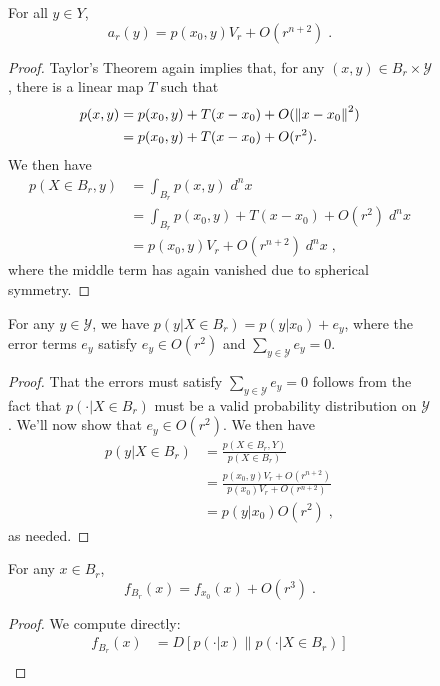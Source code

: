 \documentclass[english]{scrartcl}
\begin{document}
\begin{figure}
	\begin{lm}
		For all $y\in Y$,
		\begin{equation*}
			a_r(y) = p(x_0,y)V_r + O(r^{n+2})\;.
		\end{equation*}
	\end{lm}
	\begin{proof}
		Taylor's Theorem again implies that, for any $(x,y)\in B_r \times \mathcal{Y}$, there is a linear map $T$ such that
		\begin{align*}
			p(x,y) &= p(x_0,y) + T(x - x_0) + O(\left\lVert x - x_0\right\rVert^2) \\
			&= p(x_0,y) + T(x - x_0) + O(r^2). 
		\end{align*}
		We then have 
		\begin{align*}
			p(X \in B_r, y) &= \int_{B_r} p(x,y) \; d^n x \\ 
			&= \int_{B_r} p(x_0,y) + T(x - x_0) + O(r^2) \; d^n x \\
			&= p(x_0,y)V_r + O(r^{n+2}) \; d^n x\;,
		\end{align*}
		where the middle term has again vanished due to spherical symmetry. 
	\end{proof}
	\begin{lm}
		For any $y \in \mathcal{Y}$, we have $p(y|X \in B_r) = p(y|x_0) + e_y$, where the error terms $e_y$ satisfy $e_y \in O(r^2)$ and $\sum_{y \in \mathcal{Y}} e_y = 0$. 
	\end{lm}
	\begin{proof}
		That the errors must satisfy $\sum_{y \in \mathcal{Y}} e_y = 0$ follows from the fact that $p(\cdot| X \in B_r)$ must be a valid probability distribution on $\mathcal{Y}$. We'll now show that $e_y \in O(r^2)$. We then have 
		\begin{align*}
			p(y|X \in B_r) &= \frac{p(X \in B_r, Y)}{p(X\in B_r)} \\
			&= \frac{p(x_0, y)V_r + O(r^{n+2})}{p(x_0)V_r + O(r^{n+2})} \\
			&= p(y|x_0)  O(r^{2}) \tag{$V_r \propto r^n$}\;,
		\end{align*}
		as needed. 
	\end{proof}
	\begin{lm}
		For any $x \in B_r$, 
		\begin{equation*}
			f_{B_r}(x) = f_{x_0}(x) + O(r^3)\;.
		\end{equation*}
	\end{lm}
	\begin{proof}
		We compute directly: 
		\begin{align*}
			f_{B_r}(x) &= D[p(\cdot|x)\|p(\cdot|X \in B_r)] \\

\end{align*}
\end{proof}
\end{figure}
\end{document}
